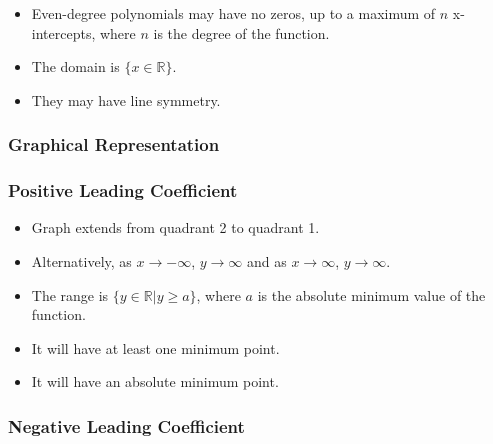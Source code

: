 \documentclass{article}
\begin{document}
\begin{itemize}
    \item Even-degree polynomials may have no zeros, up to a maximum of \( n \) x-intercepts, where \( n \) is the degree of the function.
    \item The domain is \( \{x \in \mathbb{R}\} \).
    \item They may have line symmetry.
\end{itemize}

\subsubsection*{Graphical Representation}

\begin{center}
\end{center}

\subsubsection*{Positive Leading Coefficient}

\begin{itemize}
    \item Graph extends from quadrant 2 to quadrant 1.
    \item Alternatively, as \( x \to -\infty \), \( y \to \infty \) and as \( x \to \infty \), \( y \to \infty \).
    \item The range is \( \{y \in \mathbb{R} | y \geq a\} \), where \( a \) is the absolute minimum value of the function.
    \item It will have at least one minimum point.
    \item It will have an absolute minimum point.
\end{itemize}

\subsubsection*{Negative Leading Coefficient}
\end{document}

